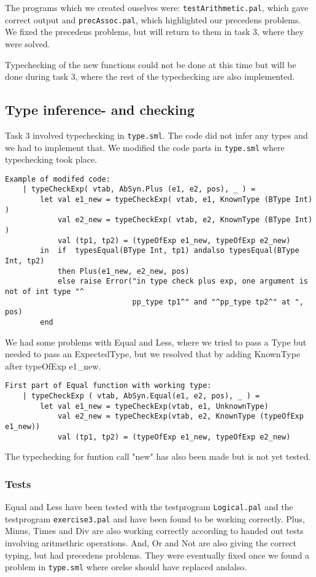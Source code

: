 \documentclass[11pt]{article}
\begin{document}
The programs which we created ouselves were: {\tt testArithmetic.pal}, which gave correct output and {\tt precAssoc.pal}, which highlighted our precedens problems. We fixed the precedens problems, but will return to them in task 3, where they were solved.

Typechecking of the new functions could not be done at this time but will be done during task 3, where the rest of the typechecking are also implemented.
 
\subsection*{Type inference- and checking}
Task 3 involved typechecking in {\tt type.sml}. The code did not infer any types and we had to implement that. We modified the code parts in {\tt type.sml} where typechecking took place.

\begin{lstlisting}
Example of modifed code:
    | typeCheckExp( vtab, AbSyn.Plus (e1, e2, pos), _ ) =
        let val e1_new = typeCheckExp( vtab, e1, KnownType (BType Int) )
            val e2_new = typeCheckExp( vtab, e2, KnownType (BType Int) )
            val (tp1, tp2) = (typeOfExp e1_new, typeOfExp e2_new)
        in  if  typesEqual(BType Int, tp1) andalso typesEqual(BType Int, tp2)
            then Plus(e1_new, e2_new, pos)
            else raise Error("in type check plus exp, one argument is not of int type "^
                             pp_type tp1^" and "^pp_type tp2^" at ", pos)
        end
\end{lstlisting}
        
We had some problems with Equal and Less, where we tried to pass a Type but needed to pass an ExpectedType, but we resolved that by adding KnownType after typeOfExp e1\_new.

\begin{lstlisting}
First part of Equal function with working type:
    | typeCheckExp ( vtab, AbSyn.Equal(e1, e2, pos), _ ) =
        let val e1_new = typeCheckExp(vtab, e1, UnknownType)
            val e2_new = typeCheckExp(vtab, e2, KnownType (typeOfExp e1_new))
            val (tp1, tp2) = (typeOfExp e1_new, typeOfExp e2_new)
\end{lstlisting}

The typechecking for funtion call "new" has also been made but is not yet tested.

\subsubsection*{Tests}
Equal and Less have been tested with the testprogram {\tt Logical.pal} and the testprogram {\tt exercise3.pal} and have been found to be working correctly. Plus, Minus, Times and Div are also working correctly according to handed out tests involving aritmethric operations. And, Or and Not are also giving the correct typing, but had precedens problems. They were eventually fixed once we found a problem in {\tt type.sml} where orelse should have replaced andalso.
\end{document}
